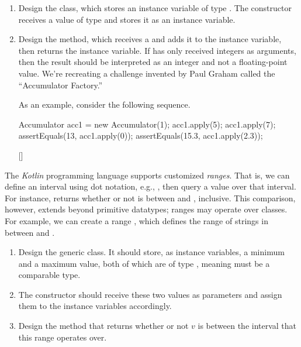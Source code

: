 \begin{enumerate}[label=(\alph*)]
  \item Design the  class, which stores an instance variable of type . The  constructor receives a value of type  and stores it as an instance variable.
  \item Design the  method, which receives a  and adds it to the instance variable, then returns the instance variable. If  has only received integers as arguments, then the result should be interpreted as an integer and not a floating-point value. We're recreating a challenge invented by Paul Graham called the ``Accumulator Factory.''

  As an example, consider the following sequence.
  \begin{verbnobox}[\small]
Accumulator acc1 = new Accumulator(1);
acc1.apply(5);
acc1.apply(7);
assertEquals(13, acc1.apply(0));
assertEquals(15.3, acc1.apply(2.3));
  \end{verbnobox}[\small]
\end{enumerate}


The \emph{Kotlin} programming language supports customized \emph{ranges}. That is, we can define an interval using dot notation, e.g., , then query a value over that interval. For instance,  returns whether or not  is between  and , inclusive. This comparison, however, extends beyond primitive datatypes; ranges may operate over classes. For example, we can create a range , which defines the range of strings in between  and .

\begin{enumerate}[label=(\alph*)]
    \item Design the generic  class. It should store, as instance variables, a minimum and a maximum value, both of which are of type , meaning  must be a comparable type.
    \item The  constructor should receive these two values as parameters and assign them to the instance variables accordingly. 
    \item Design the  method that returns whether or not $v$ is between the interval that this range operates over. 
\end{enumerate}

